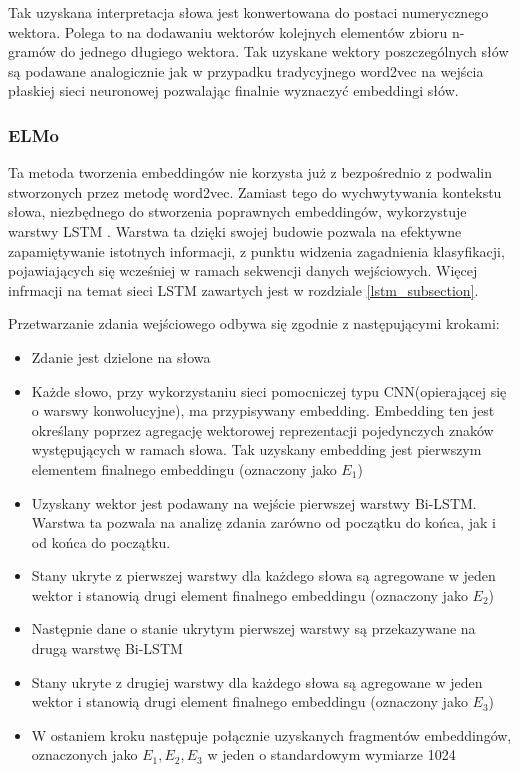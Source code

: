 Tak uzyskana interpretacja słowa jest konwertowana do postaci numerycznego wektora. Polega to na dodawaniu wektorów kolejnych elementów zbioru n-gramów do jednego długiego wektora. Tak uzyskane wektory poszczególnych słów są podawane analogicznie jak w przypadku tradycyjnego word2vec na wejścia płaskiej sieci neuronowej pozwalając finalnie wyznaczyć embeddingi słów.


\subsubsection{ELMo}

Ta metoda tworzenia embeddingów nie korzysta już z bezpośrednio z podwalin stworzonych przez metodę word2vec. Zamiast tego do wychwytywania kontekstu słowa, niezbędnego do stworzenia poprawnych embeddingów, wykorzystuje warstwy LSTM \cite{Gardner2017AllenNLP}. Warstwa ta dzięki swojej budowie pozwala na efektywne zapamiętywanie istotnych informacji, z punktu widzenia zagadnienia klasyfikacji, pojawiających się wcześniej w ramach sekwencji danych wejściowych. Więcej infrmacji na temat sieci LSTM zawartych jest w rozdziale \ref{lstm_subsection}.



Przetwarzanie zdania wejściowego odbywa się zgodnie z następującymi krokami:

\begin{itemize}
    \item Zdanie jest dzielone na słowa
    \item Każde słowo, przy wykorzystaniu sieci pomocniczej typu CNN(opierającej się o warswy konwolucyjne), ma przypisywany embedding. Embedding ten jest określany poprzez agregację wektorowej reprezentacji pojedynczych znaków występujących w ramach słowa. Tak uzyskany embedding jest pierwszym elementem finalnego embeddingu (oznaczony jako $E_1$)
    \item Uzyskany wektor jest podawany na wejście pierwszej warstwy Bi-LSTM. Warstwa ta pozwala na analizę zdania zarówno od początku do końca, jak i od końca do początku.
    \item  Stany ukryte z pierwszej warstwy dla każdego słowa są agregowane w jeden wektor i stanowią drugi element finalnego embeddingu (oznaczony jako $E_2$)
    \item Następnie dane o stanie ukrytym pierwszej warstwy są przekazywane na drugą warstwę Bi-LSTM
    \item Stany ukryte z drugiej warstwy dla każdego słowa są agregowane w jeden wektor i stanowią drugi element finalnego embeddingu (oznaczony jako $E_3$)
    \item W ostaniem kroku następuje połącznie uzyskanych fragmentów embeddingów, oznaczonych jako $E_1,E_2, E_3$ w jeden o standardowym wymiarze 1024
\end{itemize}



